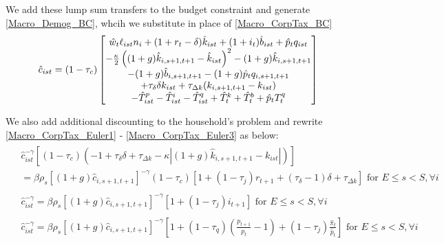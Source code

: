 \documentclass[letterpaper,12pt]{article}
\theoremstyle{definition}
\numberwithin{equation}{section}
\begin{document}
\begin{spacing}{1.5}
    We add these lump sum transfers to the budget constraint and generate \eqref{Macro_Demog_BC}, whcih we substitute in place of \eqref{Macro_CorpTax_BC}
    \begin{equation} \label{Macro_Demog_BC}
    \hat c_{ist} = (1-\tau_c)\begin{bmatrix} \hat w_t \ell_{ist} n_i + (1+r_t-\delta)\hat k_{ist} + (1+i_t)\hat b_{ist} + \hat p_t q_{ist} \\
      - \tfrac{\kappa}{2}\left((1+g)\hat k_{i,s+1,t+1} - \hat k_{ist}\right)^2 - (1+g)\hat k_{i,s+1,t+1} \\
      - (1+g)\hat b_{i,s+1,t+1} - (1+g)\hat p_t q_{i,s+1,t+1} \\
      +\tau_\delta \delta k_{ist} + \tau_{\Delta k} (k_{i,s+1,t+1} - k_{ist}) \\
      - \hat T^p_{ist} - \hat T^i_{ist} - \hat T^q_{ist} + \hat T^k_t + \hat T^b_t + \hat p_tT^q_t\end{bmatrix} \\
    \end{equation}

    We also add additional discounting to the household's problem and rewrite \eqref{Macro_CorpTax_Euler1} - \eqref{Macro_CorpTax_Euler3} as below:
    \begin{align}
    \begin{split}
    & \hat c_{ist}^{-\gamma}\left[(1-\tau_c)\left(-1+\tau_\delta \delta + \tau_{\Delta k} - \kappa \left|(1+g)\hat k_{i,s+1,t+1} - k_{ist} \right|\right)\right] \\
    & = \beta \rho_s [(1+g)\hat c_{i,s+1,t+1}]^{-\gamma}(1-\tau_c)\left[ 1 + (1-\tau_j)r_{t+1} + (\tau_\delta -1)\delta + \tau_{\Delta k} \right] \text{     for } E\le s<S,\forall i
    \end{split} \label{Macro_Demog_Euler1}\\
    \begin{split}
    & \hat c_{ist}^{-\gamma} = \beta \rho_s [(1+g)\hat c_{i,s+1,t+1}]^{-\gamma} \left[ 1+(1-\tau_j)i_{t+1} \right] \text{     for } E\le s<S,\forall i 
    \end{split} \label{Macro_Demog_Euler2}\\
    \begin{split}
    & \hat c_{ist}^{-\gamma} = \beta \rho_s [(1+g)\hat c_{i,s+1,t+1}]^{-\gamma}\left[ 1 + (1 - \tau_q)(\tfrac{p_{t+1}}{p_t}-1) + (1-\tau_j)\tfrac{\hat \pi_t}{\hat p_t} \right] \text{     for } E\le s<S,\forall i 
    \end{split} \label{Macro_Demog_Euler3}
    \end{align}


\end{spacing}
\end{document}
